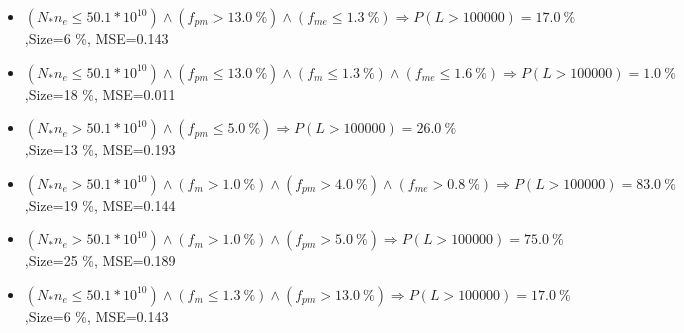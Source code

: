 \documentclass[numbered]{CSL}
\begin{document}
\begin{itemize}
\item $(N_* n_e \leq 50.1 * 10^{10}) \land (f_{pm} > 13.0~\%) \land (f_{me} \leq 1.3~\%) \Rightarrow P(L > 100 000) = 17.0~\%$,\hfill Size=6 \%, MSE=0.143
\item $(N_* n_e \leq 50.1 * 10^{10}) \land (f_{pm} \leq 13.0~\%) \land (f_m \leq 1.3~\%) \land (f_{me} \leq 1.6~\%) \Rightarrow P(L > 100 000) = 1.0~\%$,\hfill Size=18 \%, MSE=0.011
\item $(N_* n_e > 50.1 * 10^{10}) \land (f_{pm} \leq 5.0~\%) \Rightarrow P(L > 100 000) = 26.0~\%$,\hfill Size=13 \%, MSE=0.193
\item $(N_* n_e > 50.1 * 10^{10}) \land (f_m > 1.0~\%) \land (f_{pm} > 4.0~\%) \land (f_{me} > 0.8~\%) \Rightarrow P(L > 100 000) = 83.0~\%$,\hfill Size=19 \%, MSE=0.144
\item $(N_* n_e > 50.1 * 10^{10}) \land (f_m > 1.0~\%) \land (f_{pm} > 5.0~\%) \Rightarrow P(L > 100 000) = 75.0~\%$,\hfill Size=25 \%, MSE=0.189
\item $(N_* n_e \leq 50.1 * 10^{10}) \land (f_m \leq 1.3~\%) \land (f_{pm} > 13.0~\%) \Rightarrow P(L > 100 000) = 17.0~\%$,\hfill Size=6 \%, MSE=0.143
\end{itemize}
\end{document}
